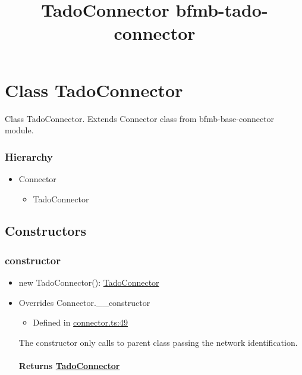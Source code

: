 \documentclass[]{article}
\title{TadoConnector \textbar{} bfmb-tado-connector}
\date{}
\providecommand{\tightlist}{%
  \setlength{\itemsep}{0pt}\setlength{\parskip}{0pt}}
\let\oldparagraph\paragraph
\renewcommand{\paragraph}[1]{\oldparagraph{#1}\mbox{}}
\begin{document}
\maketitle

\hypertarget{class-tadoconnector}{%
\section{Class TadoConnector}\label{class-tadoconnector}}

Class TadoConnector. Extends Connector class from bfmb-base-connector
module.

\hypertarget{hierarchy}{%
\subsubsection{Hierarchy}\label{hierarchy}}

\begin{itemize}
\tightlist
\item
  {Connector}

  \begin{itemize}
  \tightlist
  \item
    {TadoConnector}
  \end{itemize}
\end{itemize}

\hypertarget{constructors-1}{%
\subsection{Constructors}\label{constructors-1}}

\protect\hypertarget{constructor}{}{}

\hypertarget{constructor}{%
\subsubsection{constructor}\label{constructor}}

\begin{itemize}
\tightlist
\item
  new TadoConnector{(}{)}{:
  }\href{_connector_.tadoconnector.html}{TadoConnector}
\end{itemize}

\begin{itemize}
\item
  Overrides Connector.\_\_constructor

  \begin{itemize}
  \tightlist
  \item
    Defined in
    \href{https://github.com/BFMBFramework/TadoConnector/blob/f05932b/src/connector.ts\#L49}{connector.ts:49}
  \end{itemize}

  The constructor only calls to parent class passing the network
  identification.

  \hypertarget{returns-tadoconnector}{%
  \paragraph{\texorpdfstring{Returns
  \href{_connector_.tadoconnector.html}{TadoConnector}}{Returns TadoConnector}}\label{returns-tadoconnector}}
\end{itemize}
\end{document}
